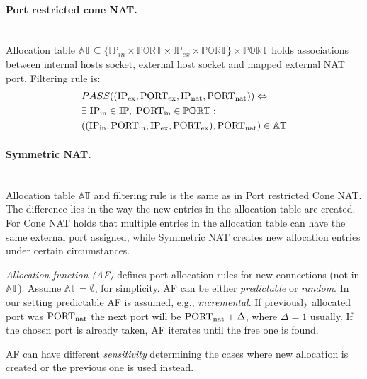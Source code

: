 \documentclass[twoside]{article}
\begin{document}
\begin{multicols}{2}
\paragraph{Port restricted cone NAT.} ~\\
Allocation table $\mathbb{AT} \subseteq \{\mathbb{IP}_{in} \times \mathbb{PORT} \times \mathbb{IP}_{ex} \times \mathbb{PORT}\} \times \mathbb{PORT}$ 
holds associations between internal hosts socket, external host socket and mapped external NAT port. 
Filtering rule is:
\begin{align*}
& PASS((\text{IP\textsubscript{ex}}, \text{PORT\textsubscript{ex}}, \text{IP\textsubscript{nat}}, \text{PORT\textsubscript{nat}} )) \Leftrightarrow \\
&  \exists \; \text{IP\textsubscript{in}} \in \mathbb{IP}, \; \text{PORT\textsubscript{in}} \in \mathbb{PORT}:\\
& ((\text{IP\textsubscript{in}}, \text{PORT\textsubscript{in}}, \text{IP\textsubscript{ex}}, \text{PORT\textsubscript{ex}}), \text{PORT\textsubscript{nat}} ) \in \mathbb{AT}
\end{align*}

\paragraph{Symmetric NAT.} ~\\
Allocation table $\mathbb{AT}$ and filtering rule is the same as in Port restricted Cone NAT. The difference lies in the way 
the new entries in the allocation table are created. For Cone NAT holds that multiple entries in the allocation table 
can have the same external port assigned, while Symmetric NAT creates new allocation entries under certain circumstances.

\emph{Allocation function (AF)} defines port allocation rules for new connections (not in $\mathbb{AT}$). Assume $\mathbb{AT}=\emptyset$, for simplicity. 
AF can be either \emph{predictable} or \emph{random}. In our setting predictable AF is assumed, e.g., \emph{incremental}. 
If previously allocated port was $\text{PORT\textsubscript{nat}}$
the next port will be $\text{PORT\textsubscript{nat}}+\Delta$, where $\Delta=1$ usually.
If the chosen port is already taken, AF iterates until the free one is found.

AF can have different \emph{sensitivity} determining the cases where new allocation is created or the previous one is used instead.


\end{multicols}
\end{document}
